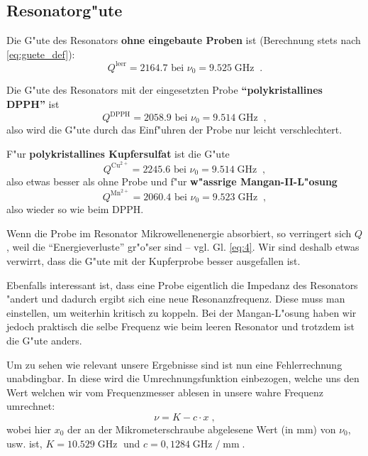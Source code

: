 \documentclass[a4paper,12pt]{article}
\newcommand{\abs}[0]{\bigskip\noindent}
\newcommand{\inh}[1]{{\bf #1}}
\begin{document}
\subsection{Resonatorg"ute}
\label{sec:resonatorgute}



Die G"ute des Resonators \inh{ohne eingebaute Proben} ist (Berechnung
stets nach \eqref{eq:guete_def}):
\begin{equation*}
	Q^\text{leer} = 2164.7  \text{ bei }
        \nu_0 = 9.525\operatorname{GHz}\;.
\end{equation*}

Die G"ute des Resonators mit der eingesetzten Probe \inh{"`polykristallines DPPH"'} ist
\begin{equation*}
	Q^\text{DPPH} = 2058.9 \text{ bei } \nu_0 = 9.514 \operatorname{GHz}\;,
\end{equation*}
also wird die G"ute durch das Einf"uhren der Probe nur leicht
verschlechtert.

F"ur \inh{polykristallines Kupfersulfat} ist die G"ute
\begin{equation*}
  Q^{\operatorname{Cu}^{2+}} = 2245.6 \text{ bei } \nu_0 = 9.514 \operatorname{GHz}\;,
\end{equation*}
also etwas besser als ohne Probe 
und f"ur \inh{w"assrige Mangan-II-L"osung}  
\begin{equation*}
  Q^{\operatorname{Mn}^{2+}} = 2060.4 \text{ bei } \nu_0 = 9.523 \operatorname{GHz}\;,
\end{equation*}
also wieder so wie beim DPPH.


\abs
Wenn die Probe im Resonator Mikrowellenenergie absorbiert, so
verringert sich $Q$, weil die "`Energieverluste"' gr"o"ser sind --
vgl. Gl. \eqref{eq:4}. Wir sind deshalb etwas verwirrt, dass die G"ute
mit der Kupferprobe  besser ausgefallen ist. 

Ebenfalls interessant ist, dass eine Probe eigentlich die
Impedanz des Resonators "andert und dadurch ergibt sich eine neue
Resonanzfrequenz. Diese muss man einstellen, um weiterhin kritisch zu
koppeln. Bei der Mangan-L"osung haben wir jedoch praktisch die selbe
Frequenz wie beim leeren Resonator und trotzdem ist die G"ute anders.

\abs
%
Um zu sehen wie relevant unsere Ergebnisse sind ist nun eine
Fehlerrechnung unabdingbar.  In diese wird die Umrechnungsfunktion
einbezogen, welche uns den Wert welchen wir vom Frequenzmesser ablesen
in unsere wahre Frequenz umrechnet:
\begin{equation}
  \nu = {K - c \cdot x} \;,
\end{equation}
wobei hier $x_0$ der an der Mikrometerschraube abgelesene Wert (in mm)
von $\nu_0$, usw. ist, $K = 10.529\operatorname{GHz}$ und $c =
0,1284\operatorname{GHz}/\operatorname{mm}$.
\end{document}
